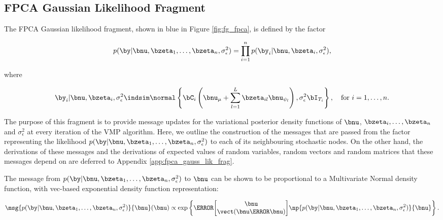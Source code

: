 \documentclass[12pt]{article}
\def\sigsqeps{\sigma^2_{\epsilon}}
\def\numu{\bnu_\mu}
\newcommand\nupsi[1]{\bnu_{\psi_{#1}}}
\theoremstyle{plain}
\theoremstyle{definition}
\theoremstyle{remark}
\begin{document}

\subsection{FPCA Gaussian Likelihood Fragment}
\label{sec:fpca_gauss_lik_frag}

The FPCA Gaussian likelihood fragment, shown in blue in Figure \ref{fig:fg_fpca}, is defined by the factor

\begin{equation}
	p (\by | \bnu, \bzeta_1, \dots, \bzeta_n, \sigsqeps) =
		\prod_{i=1}^n p (\by_i | \bnu, \bzeta_i, \sigsqeps),
\label{fpc_gauss_lik_factorized}
\end{equation}

\noindent where

\begin{equation}
	\by_i | \bnu, \bzeta_i, \sigsqeps \indsim \normal \left\{
		\bC_i \left( \numu + \sum_{l=1}^L \bzeta_{il} \nupsi{l} \right), \sigsqeps \bI_{T_i}
	\right\}, \quad \text{for $i = 1, \dots, n$}.
\label{fpc_gauss_lik_factor}
\end{equation}

\noindent The purpose of this fragment is to provide message updates for the variational posterior density functions
of $\bnu$, $\bzeta_i, \dots, \bzeta_n$ and $\sigsqeps$ at every iteration of the VMP algorithm.
Here, we outline the construction of the messages that are passed from the factor representing
the likelihood $p (\by | \bnu, \bzeta_1, \dots, \bzeta_n, \sigsqeps)$ to each of its neighbouring stochastic nodes.
On the other hand, the
derivations of these messages and the derivations of expected values of random variables, random vectors
and random matrices that these messages depend on are deferred to Appendix \ref{app:fpca_gauss_lik_frag}.

The message from $p (\by | \bnu, \bzeta_1, \dots, \bzeta_n, \sigsqeps)$ to $\bnu$ can be shown to be
proportional to a Multivariate
Normal density function, with vec-based exponential density function representation:

\begin{equation}
	\msg{p (\by | \bnu, \bzeta_1, \dots, \bzeta_n, \sigsqeps)}{\bnu} (\bnu) \propto
		\exp \left\{
			\T{\begin{bmatrix}
				\bnu \\
				\vect (\bnu \T{\bnu})
			\end{bmatrix}}
			\np{p (\by | \bnu, \bzeta_1, \dots, \bzeta_n, \sigsqeps)}{\bnu}
		\right\}.
\label{msg_lik_nu}
\end{equation}
\end{document}
